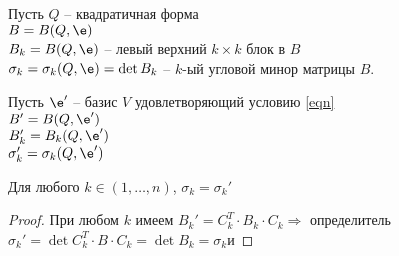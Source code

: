 Пусть $Q$ -- квадратичная форма \\
$B = B(Q, \e)$ \\
$B_k = B(Q, \e)$ -- левый верхний $k \times k$ блок в $B$\\
$\sigma_k = \sigma_k(Q, \e) = \det B_k$ -- $k$-ый угловой минор матрицы $B$.

Пусть $\e'$ -- базис $V$ удовлетворяющий условию \eqref{eqn} \\
$B' = B(Q, \e')$ \\
$B_k' = B_k(Q, \e')$ \\
$\sigma_k' = \sigma_k(Q, \e')$

\begin{Lemma}
  Для любого $k \in (1, \ldots, n)$, $\sigma_k = \sigma_k'$
  \begin{proof}
    При любом $k$ имеем $B_k' = C_k^T \cdot B_k \cdot C_k \Rightarrow$ определитель $\sigma_k' = \det C_k^T \cdot B \cdot C_k = \det B_k = \sigma_k$и
  \end{proof}
\end{Lemma}
\newpage
